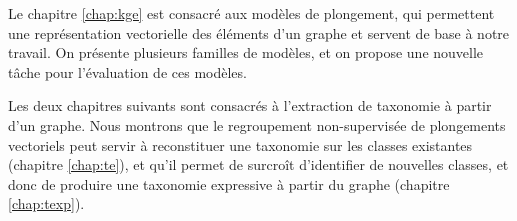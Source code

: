 Le chapitre \ref{chap:kge} est consacré aux modèles de plongement, qui permettent une représentation vectorielle des éléments d'un graphe et servent de base à notre travail. On présente plusieurs familles de modèles, et on propose une nouvelle tâche pour l'évaluation de ces modèles.





Les deux chapitres suivants sont consacrés à l'extraction de taxonomie à partir d'un graphe. Nous montrons que le regroupement non-supervisée de plongements vectoriels peut servir à reconstituer une taxonomie sur les classes existantes (chapitre \ref{chap:te}), %
et qu'il permet de surcroît d'identifier de nouvelles classes, et donc de produire une taxonomie expressive à partir du graphe (chapitre \ref{chap:texp}).



\clearpage